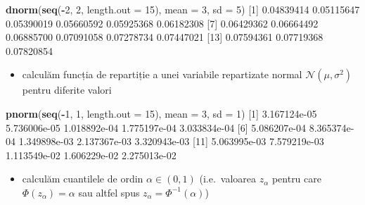 \documentclass[]{article}
\newenvironment{Shaded}{\begin{snugshade}}{\end{snugshade}}
\newcommand{\KeywordTok}[1]{\textcolor[rgb]{0.13,0.29,0.53}{\textbf{#1}}}
\newcommand{\DataTypeTok}[1]{\textcolor[rgb]{0.13,0.29,0.53}{#1}}
\newcommand{\DecValTok}[1]{\textcolor[rgb]{0.00,0.00,0.81}{#1}}
\newcommand{\FloatTok}[1]{\textcolor[rgb]{0.00,0.00,0.81}{#1}}
\newcommand{\OperatorTok}[1]{\textcolor[rgb]{0.81,0.36,0.00}{\textbf{#1}}}
\newcommand{\NormalTok}[1]{#1}
\providecommand{\tightlist}{%
  \setlength{\itemsep}{0pt}\setlength{\parskip}{0pt}}
\begin{document}
\begin{Shaded}
\begin{Highlighting}[]
\KeywordTok{dnorm}\NormalTok{(}\KeywordTok{seq}\NormalTok{(}\OperatorTok{-}\DecValTok{2}\NormalTok{, }\DecValTok{2}\NormalTok{, }\DataTypeTok{length.out =} \DecValTok{15}\NormalTok{), }\DataTypeTok{mean =} \DecValTok{3}\NormalTok{, }\DataTypeTok{sd =} \DecValTok{5}\NormalTok{)}
\NormalTok{ [}\DecValTok{1}\NormalTok{] }\FloatTok{0.04839414} \FloatTok{0.05115647} \FloatTok{0.05390019} \FloatTok{0.05660592} \FloatTok{0.05925368} \FloatTok{0.06182308}
\NormalTok{ [}\DecValTok{7}\NormalTok{] }\FloatTok{0.06429362} \FloatTok{0.06664492} \FloatTok{0.06885700} \FloatTok{0.07091058} \FloatTok{0.07278734} \FloatTok{0.07447021}
\NormalTok{[}\DecValTok{13}\NormalTok{] }\FloatTok{0.07594361} \FloatTok{0.07719368} \FloatTok{0.07820854}
\end{Highlighting}
\end{Shaded}

\begin{itemize}
\tightlist
\item
  calculăm funcția de repartiție a unei variabile repartizate normal
  \(\mathcal{N}(\mu, \sigma^2)\) pentru diferite valori
\end{itemize}

\begin{Shaded}
\begin{Highlighting}[]
\KeywordTok{pnorm}\NormalTok{(}\KeywordTok{seq}\NormalTok{(}\OperatorTok{-}\DecValTok{1}\NormalTok{, }\DecValTok{1}\NormalTok{, }\DataTypeTok{length.out =} \DecValTok{15}\NormalTok{), }\DataTypeTok{mean =} \DecValTok{3}\NormalTok{, }\DataTypeTok{sd =} \DecValTok{1}\NormalTok{)}
\NormalTok{ [}\DecValTok{1}\NormalTok{] }\FloatTok{3.167124e-05} \FloatTok{5.736006e-05} \FloatTok{1.018892e-04} \FloatTok{1.775197e-04} \FloatTok{3.033834e-04}
\NormalTok{ [}\DecValTok{6}\NormalTok{] }\FloatTok{5.086207e-04} \FloatTok{8.365374e-04} \FloatTok{1.349898e-03} \FloatTok{2.137367e-03} \FloatTok{3.320943e-03}
\NormalTok{[}\DecValTok{11}\NormalTok{] }\FloatTok{5.063995e-03} \FloatTok{7.579219e-03} \FloatTok{1.113549e-02} \FloatTok{1.606229e-02} \FloatTok{2.275013e-02}
\end{Highlighting}
\end{Shaded}

\begin{itemize}
\tightlist
\item
  calculăm cuantilele de ordin \(\alpha\in(0,1)\) (i.e.~valoarea
  \(z_{\alpha}\) pentru care \(\Phi(z_{\alpha}) = \alpha\) sau altfel
  spus \(z_{\alpha} = \Phi^{-1}(\alpha)\))
\end{itemize}
\end{document}
